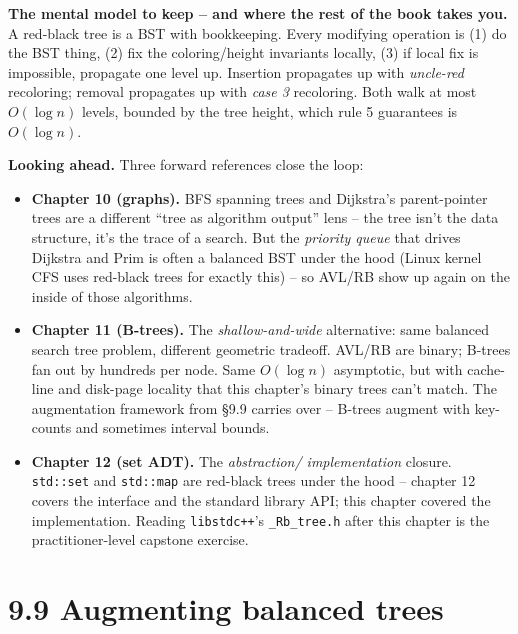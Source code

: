 \documentclass[11pt]{article}
\begin{document}
\begin{ideabox}
\textbf{The mental model to keep -- and where the rest of the book
takes you.} A red-black tree is a BST with bookkeeping. Every
modifying operation is (1) do the BST thing, (2) fix the
coloring/height invariants locally, (3) if local fix is impossible,
propagate one level up. Insertion propagates up with
\emph{uncle-red} recoloring; removal propagates up with
\emph{case 3} recoloring. Both walk at most $O(\log n)$ levels,
bounded by the tree height, which rule 5 guarantees is
$O(\log n)$.

\medskip

\textbf{Looking ahead.} Three forward references close the loop:
\begin{itemize}[leftmargin=*]
    \item \textbf{Chapter 10 (graphs).} BFS spanning trees and
          Dijkstra's parent-pointer trees are a different
          ``tree as algorithm output'' lens -- the tree isn't the
          data structure, it's the trace of a search. But the
          \emph{priority queue} that drives Dijkstra and Prim is
          often a balanced BST under the hood (Linux kernel CFS
          uses red-black trees for exactly this) -- so AVL/RB
          show up again on the inside of those algorithms.
    \item \textbf{Chapter 11 (B-trees).} The
          \emph{shallow-and-wide} alternative: same balanced search
          tree problem, different geometric tradeoff. AVL/RB are
          binary; B-trees fan out by hundreds per node. Same
          $O(\log n)$ asymptotic, but with cache-line and
          disk-page locality that this chapter's binary trees
          can't match. The augmentation framework from \S9.9
          carries over -- B-trees augment with key-counts and
          sometimes interval bounds.
    \item \textbf{Chapter 12 (set ADT).} The \emph{abstraction/
          implementation} closure. \texttt{std::set} and
          \texttt{std::map} are red-black trees under the hood --
          chapter 12 covers the interface and the standard library
          API; this chapter covered the implementation. Reading
          \texttt{libstdc++}'s \texttt{\_Rb\_tree.h} after this
          chapter is the practitioner-level capstone exercise.
\end{itemize}
\end{ideabox}

\section{9.9 Augmenting balanced trees}
\end{document}

